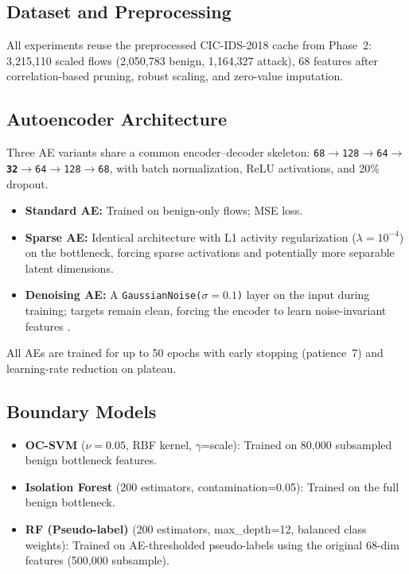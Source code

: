 \documentclass[10pt,conference]{IEEEtran}
\begin{document}
\subsection{Dataset and Preprocessing}

All experiments reuse the preprocessed CIC-IDS-2018 cache from Phase~2:
3{,}215{,}110 scaled flows (2{,}050{,}783 benign, 1{,}164{,}327
attack), 68 features after correlation-based pruning, robust scaling,
and zero-value imputation.

\subsection{Autoencoder Architecture}

Three AE variants share a common encoder--decoder skeleton:
\texttt{68$\to$128$\to$64$\to$\textbf{32}$\to$64$\to$128$\to$68},
with batch normalization, ReLU activations, and 20\% dropout.

\begin{itemize}[leftmargin=*,noitemsep]
  \item \textbf{Standard AE:} Trained on benign-only flows; MSE loss.
  \item \textbf{Sparse AE:} Identical architecture with L1 activity
        regularization ($\lambda=10^{-4}$) on the bottleneck, forcing
        sparse activations and potentially more separable latent
        dimensions.
  \item \textbf{Denoising AE:} A \texttt{GaussianNoise($\sigma=0.1$)}
        layer on the input during training; targets remain clean,
        forcing the encoder to learn noise-invariant features
        \cite{vincent2010}.
\end{itemize}

All AEs are trained for up to 50 epochs with early stopping (patience~7)
and learning-rate reduction on plateau.

\subsection{Boundary Models}

\begin{itemize}[leftmargin=*,noitemsep]
  \item \textbf{OC-SVM} ($\nu=0.05$, RBF kernel, $\gamma$=scale):
        Trained on 80{,}000 subsampled benign bottleneck features.
  \item \textbf{Isolation Forest} (200 estimators,
        contamination=0.05): Trained on the full benign bottleneck.
  \item \textbf{RF (Pseudo-label)} (200 estimators, max\_depth=12,
        balanced class weights): Trained on AE-thresholded pseudo-labels
        using the original 68-dim features (500{,}000 subsample).
\end{itemize}
\end{document}
